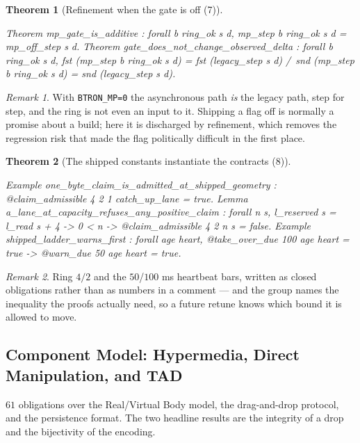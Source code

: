 \documentclass[10pt,journal,compsoc,twocolumn]{article}
\newtheorem{theorem}{Theorem}[section]
\theoremstyle{definition}
\theoremstyle{remark}
\newtheorem{remark}{Remark}[section]
\theoremstyle{plain}
\newcommand{\ctr}[1]{\texttt{#1}}
\begin{document}
\begin{theorem}[Refinement when the gate is off (7)]
\begin{coc}
Theorem mp_gate_is_additive : forall b ring_ok s d, mp_step b ring_ok s d = mp_off_step s d.
Theorem gate_does_not_change_observed_delta : forall b ring_ok s d,
  fst (mp_step b ring_ok s d) = fst (legacy_step s d) /\
  snd (mp_step b ring_ok s d) = snd (legacy_step s d).
\end{coc}\end{theorem}
\begin{remark}
With \ctr{BTRON\_MP=0} the asynchronous path \emph{is} the legacy path, step for
step, and the ring is not even an input to it. Shipping a flag off is normally a
promise about a build; here it is discharged by refinement, which removes the
regression risk that made the flag politically difficult in the first place.
\end{remark}

\begin{theorem}[The shipped constants instantiate the contracts (8)]
\begin{coc}
Example one_byte_claim_is_admitted_at_shipped_geometry :
  @claim_admissible 4 2 1 catch_up_lane = true.
Lemma a_lane_at_capacity_refuses_any_positive_claim : forall n s,
  l_reserved s = l_read s + 4 -> 0 < n -> @claim_admissible 4 2 n s = false.
Example shipped_ladder_warns_first : forall age heart,
  @take_over_due 100 age heart = true -> @warn_due 50 age heart = true.
\end{coc}\end{theorem}
\begin{remark}
Ring \(4/2\) and the \(50\)/\(100\) ms heartbeat bars, written as closed
obligations rather than as numbers in a comment --- and the group names the
inequality the proofs actually need, so a future retune knows which bound it is
allowed to move.
\end{remark}

\subsection{Component Model: Hypermedia, Direct Manipulation, and TAD}
\label{sec:acct:dnd}

\(61\) obligations over the Real/Virtual Body model, the drag-and-drop protocol,
and the persistence format. The two headline results are the integrity of a drop
and the bijectivity of the encoding.
\end{document}
